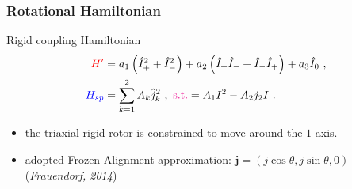 \documentclass{beamer}
\begin{document}
\begin{frame}
	\frametitle{Rotational Hamiltonian}
	\begin{exampleblock}{Rigid coupling Hamiltonian}
		\begin{align}
			{\color{red}H'}&=a_1\left(\hat{I}_+^2+\hat{I}_-^2\right)+a_2\left(\hat{I}_+\hat{I}_-+\hat{I}_-\hat{I}_+\right)+a_3\hat{I}_0\ ,\nonumber\\
			{\color{blue}H_{sp}}&=\sum_{k=1}^2A_k\hat{j}_k^2\ ,\ {\color{magenta}\text{s.t.}}=A_1I^2-A_2j_2I\ .\nonumber
		\end{align}
	\end{exampleblock}
	\begin{itemize}
		\item the triaxial rigid rotor is constrained to move around the $1$-axis.
		\item adopted Frozen-Alignment approximation: $\mathbf{j}=(j\cos\theta,j\sin\theta,0)$ (\textit{Frauendorf, 2014})
	\end{itemize}
\end{frame}
\end{document}
